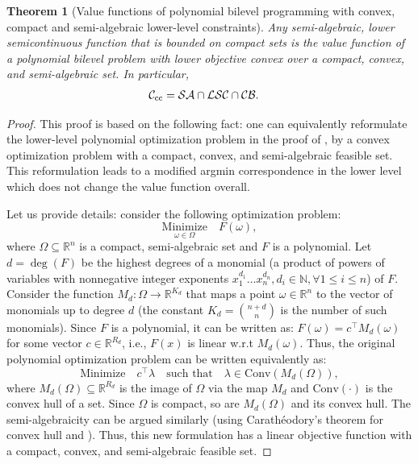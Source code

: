 \documentclass{article}
\newcommand*{\cC}{\mathcal{C}}
\newcommand*{\RR}{\mathbb{R}}
\newcommand*{\NN}{\mathbb{N}}
\newcommand{\SA}{\mathcal{SA}}
\newcommand{\LSC}{\mathcal{LSC}}
\newcommand{\BC}{\mathcal{CB}}
\newcommand{\coco}{\text{cc}}
\newcommand{\conv}[1]{\text{Conv}(#1)}
\theoremstyle{plain}
\newtheorem{theorem}{Theorem}[section]
\theoremstyle{definition}
\begin{document}
\begin{theorem}[Value functions of polynomial bilevel programming with convex, compact and semi-algebraic lower-level constraints]
    \label{theorem:compact-convex=LSC}
    Any semi-algebraic, lower semicontinuous function that is bounded on compact sets is the value function of a polynomial bilevel problem with lower objective convex over a compact, convex, and semi-algebraic set. In particular,
    \begin{equation*}
        \begin{aligned}
            \cC_{\textup{\coco}} &= \SA \cap \LSC \cap \BC.
        \end{aligned}
    \end{equation*}
\end{theorem}
\begin{proof}
    This proof is based on the following fact: one can equivalently reformulate the lower-level polynomial optimization problem in the proof of , by a convex optimization problem with a compact, convex, and semi-algebraic feasible set. {This reformulation leads to a modified argmin correspondence in the lower level which does not change the value function overall}. %

    Let us provide details: consider the following optimization problem:
    \begin{equation*}
        \underset{\omega \in \Omega}{\text{Minimize}} \quad F(\omega),
    \end{equation*}
    where $\Omega \subseteq \RR^n$ is a compact, semi-algebraic set and $F$ is a polynomial. Let $d = \deg(F)$ be the highest degrees of a monomial (a product of powers of variables with nonnegative integer exponents $x_1^{d_1}\ldots x_n^{d_n}, d_i \in \NN, \forall 1 \leq i \leq n$) of $F$. Consider the function $M_d: \Omega \to \RR^{K_d}$ that maps a point $\omega \in \RR^n$ to the vector of monomials up to degree $d$ (the constant $K_d = {n + d \choose n}$ is the number of such monomials). Since $F$ is a polynomial, it can be written as: $F(\omega) = c^\top M_d(\omega)$ for some vector $c \in \RR^{R_d}$, i.e., $F(x)$ is linear w.r.t $M_d(\omega)$. Thus, the original polynomial optimization problem can be written equivalently as:
    \begin{equation*}
        {\text{Minimize}} \quad c^\top \lambda \quad \text{such that} \quad \lambda \in \conv{M_d(\Omega)},
    \end{equation*}
    where $M_d(\Omega) \subseteq \RR^{R_d}$ is the image of $\Omega$ via the map $M_d$ and $\conv{\cdot}$ is the convex hull of a set. Since $\Omega$ is compact, so are $M_d(\Omega)$ and its convex hull. The semi-algebraicity can be argued similarly (using Carathéodory's theorem for convex hull \cite[Theorem $0.0.1$]{vershyninHighdimensionalProbabilityIntroduction2018} and ). Thus, this new formulation has a linear objective function with a compact, convex, and semi-algebraic feasible set.  


\end{proof}
\end{document}
